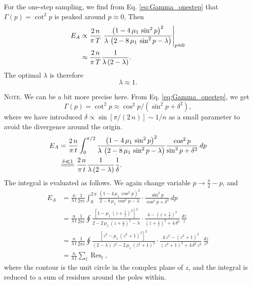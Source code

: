 \documentclass[reprint, floatfix]{revtex4-1}
\newcommand{\note}[1]{{\color{DarkGreen}\footnotesize \textsc{Note.} #1}}
\newcommand{\Err}{E}
\begin{document}
For the one-step sampling,
we find from Eq. \eqref{eq:Gamma_onestep}
that $\Gamma(p) = \cot^2 p$
is peaked around $p \approx 0$,
%
Then
$$
\begin{aligned}
\Err_A
&
\propto
\frac{   2 \, n }
     { \pi \, T }
\left.
\frac{            \left(1 - 4 \, \mu_1 \, \sin^2 p \right)^2         }
     { \lambda \, \left(2 - 8 \, \mu_1 \, \sin^2 p - \lambda \right) }
\right|_{ p \approx 0 }
\notag \\
&
\approx
\frac{   2 \, n }
     { \pi \, T }
\frac{             1             }
     {  \lambda \, (2 - \lambda) }
.
\end{aligned}
$$
%
The optimal $\lambda$ is therefore
%
\begin{equation}
\lambda \approx 1.
\label{eq:lambda_nn_onestep}
\end{equation}
%
\note{We can be a bit more precise here.
%
From Eq. \eqref{eq:Gamma_onestep}, we get
%
$$
\Gamma(p) = \cot^2 p \approx \cos^2 p / (\sin^2 p + \delta^2),
$$
%
where we have introduced
$\delta \propto \sin[ \pi / (2 \, n) ] \sim 1/n$
as a small parameter to avoid the divergence
around the origin.
%
$$
\begin{aligned}
\Err_A
&=
\frac{   2 \, n }
     { \pi \, t }
\int_0^{\pi/2}
    \frac{            \left(1 - 4 \, \mu_1 \, \sin^2 p \right)^2         }
         { \lambda \, \left(2 - 8 \, \mu_1 \, \sin^2 p - \lambda \right) }
    \frac{ \cos^2 p }
         { \sin^2 p + \delta^2 }
\, dp
\notag \\
&
\stackrel{    \delta \ll 1     }
         { =\joinrel=\joinrel= }
\frac{   2 \, n }
     { \pi \, t }
\frac{             1             }
     {  \lambda \, (2 - \lambda) }
\frac{    1   }
     { \delta }
.
\end{aligned}
$$
The integral is evaluated as follows.
%
We again change variable $p \to \frac{ \pi } { 2 } - p$,
and
$$
\begin{aligned}
\Err_A
&=
\frac{n}{\lambda \, t}
\frac{1}{2 \pi i}
\int_0^{2 \, \pi}
\frac{ \left(1 - 4 \, \mu_1 \, \cos^2 p \right)^2 }
     {       2 - 8 \, \mu_1 \, \cos^2 p - \lambda }
\cdot
\frac{ \sin^2 p            }
     { \cos^2 p + \delta^2 }
\, dp
\\
&=
\frac{n}{\lambda \, t}
\frac{1}{2 \pi i}
\oint
\frac{ \left[1 -      \mu_1 \, \left(z + \frac{1}{z}\right)^2 \right]^2 }
     {       2 - 2 \, \mu_1 \, \left(z + \frac{1}{z}\right)^2 - \lambda }
\cdot
\frac{ 4 - \left( z + \frac 1 z \right)^2 }
     { \left( z + \frac 1 z \right)^2 + 4 \, \delta^2 }
\, \frac{dz}{z}
\\
&=
\frac{n}{\lambda \, t}
\frac{1}{2 \pi i}
\oint
\frac{ \left[z^2 -      \mu_1 \, (z^2 + 1)^2 \right]^2   }
     {  (2 - \lambda) \, z^2 - 2 \, \mu_1 \, (z^2 + 1)^2 }
\cdot
\frac{ 4 \, z^2 - ( z^2 + 1 )^2 }
     { ( z^2 + 1 )^2 + 4 \, \delta^2 \, z^2 }
\, \frac{ dz }{ z^3 }
\\
&=
\frac{ n } { \lambda \, t }
\sum_l \operatorname{Res}_l
,
\end{aligned}
$$
where the contour is the unit circle
in the complex plane of $z$,
and the integral is reduced to a sum of residues
around the poles within.

}
\end{document}
